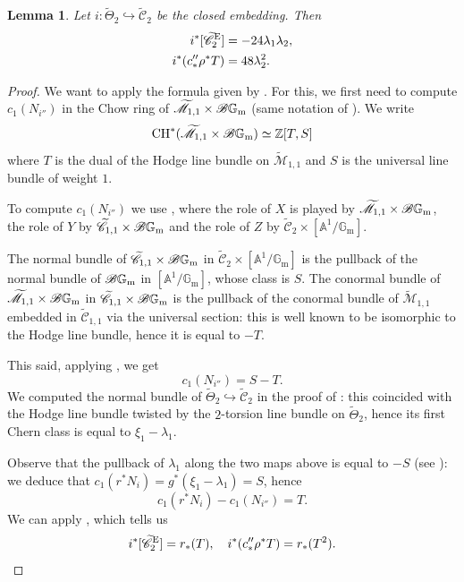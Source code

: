\documentclass[a4paper, 10pt]{amsart}
\numberwithin{equation}{section}
\numberwithin{subsection}{section}
\newtheorem{lemma}[theorem]{Lemma}
\theoremstyle{definition}
\theoremstyle{remark}
\renewcommand{\mathcal}{\mathscr}
\renewcommand\AA{\mathbb{A}} \newcommand\BB{\mathbb{B}}
\newcommand\GG{\mathbb{G}} \newcommand\HH{\mathbb{H}}
\newcommand\rmm{\mathrm{m}} \newcommand\rmn{\mathrm{n}}
\newcommand{\gm}{\GG_{\rmm}}
\newcommand{\Mtilde}{\widetilde{\mathcal M}}
\newcommand{\Ctilde}{\widetilde{\mathcal C}}
\newcommand{\ThTilde}{\widetilde{\Theta}}
\newcommand{\ch}[1][*]{\operatorname{CH}^{#1}}
\begin{document}
	\begin{lemma}\label{lm:C2tilde in the closed}
		Let $i\colon\ThTilde_2\hookrightarrow \Ctilde_2$ be the closed embedding. Then
		\begin{align*}
		    i^*[\Ctilde_2^{\rm E}] &= -24\lambda_1\lambda_2, \\
		    i^*(c''_*\rho^*T) &= 48\lambda_2^2.
		\end{align*} 
	\end{lemma}
	\begin{proof}
		We want to apply the formula given by . For this, we first need to compute $c_1(N_{i''})$ in the Chow ring of $\Mtilde_{1,1}\times\cB\gm$ (same notation of ). We write
		\[ \ch(\Mtilde_{1,1}\times\cB\gm) \simeq \ZZ[T,S] \]
		where $T$ is the dual of the Hodge line bundle on $\Mtilde_{1,1}$ and $S$ is the universal line bundle of weight $1$.
		
		To compute $c_1(N_{i''})$ we use , where the role of $X$ is played by $\Mtilde_{1,1}\times\cB\gm$, the role of $Y$ by $\Ctilde_{1,1}\times\cB\gm$ and the role of $Z$ by $\Ctilde_2\times[\AA^1/\gm]$.
		
		The normal bundle of $\Ctilde_{1,1}\times\cB\gm$ in $\Ctilde_2\times[\AA^1/\gm]$ is the pullback of the normal bundle of $\cB\gm$ in $[\AA^1/\gm]$, whose class is $S$. The conormal bundle of $\Mtilde_{1,1}\times\cB\gm$ in $\Ctilde_{1,1}\times\cB\gm$ is the pullback of the conormal bundle of $\Mtilde_{1,1}$ embedded in $\Ctilde_{1,1}$ via the universal section: this is well known to be isomorphic to the Hodge line bundle, hence it is equal to $-T$.
		
		This said, applying , we get
		\[ c_1(N_{i''}) = S - T. \]
		We computed the normal bundle of $\ThTilde_2\hookrightarrow\Ctilde_2$ in the proof of : this coincided with the Hodge line bundle twisted by the $2$-torsion line bundle on $\ThTilde_2$, hence its first Chern class is equal to $\xi_1-\lambda_1$. 
		
		Observe that the pullback of $\lambda_1$ along the two maps above is equal to $-S$ (see ): we deduce that $c_1(r^*N_{i})=g^*(\xi_1-\lambda_1)=S$, hence
		\[c_1(r^*N_{i})-c_1(N_{i''})=T. \]
		We can apply , which tells us
		\[ i^*[\Ctilde^{\rm E}_2] = r_*(T),\quad i^*(c''_*\rho^*T) = r_*(T^2). \]
		

\end{proof}
\end{document}
